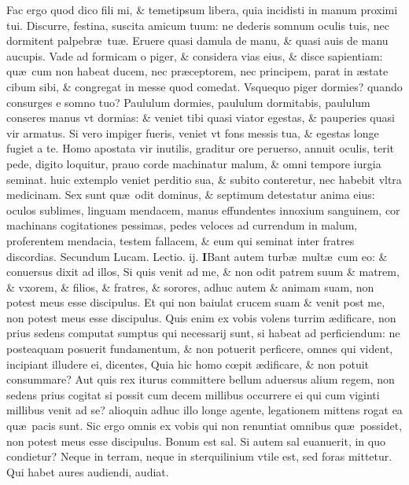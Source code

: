 \documentclass[a5paper,10pt]{book}
\def\rightmarginnote{%
	\lrmarginnote{\hskip\columnwidth \hskip -1em}}
\def\ae{æ}
\def\oe{œ}
\begin{document}
\begin{multicols*}{2}
Fac ergo quod dico fili mi, \& temetipsum libera, quia incidisti in manum proximi tui.
Discurre, festina, suscita amicum tuum: ne dederis somnum oculis tuis, nec dormitent palpebr\ae \ tu\ae .
Eruere quasi damula de manu, \& quasi auis de manu aucupis.
Vade ad formicam o piger, \& considera vias eius, \& disce sapientiam: qu\ae \ cum non habeat ducem, nec pr\ae ceptorem, nec principem, parat in \ae state cibum sibi, \& congregat in messe quod comedat.
Vsquequo piger dormies? quando consurges e somno tuo?
Paululum dormies, paululum dormitabis, paululum conseres manus vt dormias: \& veniet tibi quasi viator egestas, \& pauperies quasi vir armatus.
Si vero impiger fueris, veniet vt fons messis tua, \& egestas longe fugiet a te.
Homo apostata vir inutilis, graditur ore peruerso, annuit oculis, terit pede, digito loquitur, prauo corde machinatur malum, \& omni tempore iurgia seminat. huic extemplo veniet perditio sua, \& subito conteretur, nec habebit vltra medicinam.
Sex sunt qu\ae \ odit dominus, \& septimum detestatur anima eius: oculos sublimes, linguam mendacem, manus effundentes innoxium sanguinem, cor machinans cogitationes pessimas, pedes veloces ad currendum in malum, proferentem mendacia, testem fallacem, \& eum qui seminat inter fratres discordias.
\newline \color{red} Secundum Lucam. \hfill Lectio. ij. \color{black}
\vspace{-.25em}
\lettrine[lines=2]{\bfseries \color{red} I}{}Bant\rightmarginnote{c. 14.} autem turb\ae \ mult\ae \ cum eo: \& conuersus dixit ad illos, Si quis venit ad me, \& non odit patrem suum \& matrem, \& vxorem, \& filios, \& fratres, \& sorores, adhuc autem \& animam suam, non potest meus esse discipulus.
Et qui non baiulat crucem suam \& venit post me, non potest meus esse discipulus.
Quis enim ex vobis volens turrim \ae dificare, non prius sedens computat sumptus qui
necessarij sunt, si habeat ad perficiendum: ne posteaquam posuerit fundamentum, \& non potuerit perficere, omnes qui vident, incipiant illudere ei, dicentes, Quia hic homo c\oe pit \ae dificare, \& non potuit consummare?
Aut quis rex iturus committere bellum aduersus alium regem, non sedens prius cogitat si possit cum decem millibus occurrere ei qui cum viginti millibus venit ad se? alioquin adhuc illo longe agente, legationem mittens rogat ea qu\ae \ pacis sunt.
Sic ergo omnis ex vobis qui non renuntiat omnibus qu\ae \ possidet, non potest meus esse discipulus.
Bonum est sal. Si autem sal euanuerit, in quo condietur?
Neque in terram, neque in sterquilinium vtile est, sed foras mittetur. Qui habet aures audiendi, audiat. \textdagger \ 

\end{multicols*}
\end{document}
